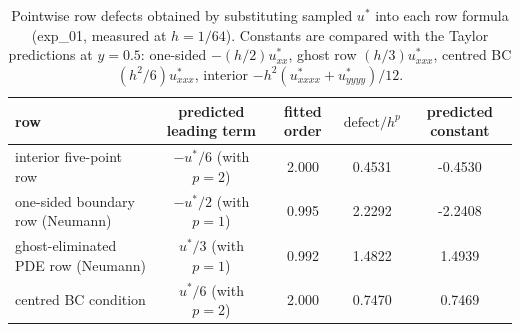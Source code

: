 \begin{table}[H]
\centering\footnotesize\setlength{\tabcolsep}{4pt}
\caption{Pointwise row defects obtained by substituting sampled $u^*$ into each row formula (exp\_01, measured at $h=1/64$).  Constants are compared with the Taylor predictions at $y=0.5$: one-sided $-(h/2)u^*_{xx}$, ghost row $(h/3)u^*_{xxx}$, centred BC $(h^2/6)u^*_{xxx}$, interior $-h^2(u^*_{xxxx}+u^*_{yyyy})/12$.}
\label{tab:rowdefects}
\begin{tabular}{lcccc}
\toprule
row & predicted leading term & fitted order & $\text{defect}/h^{p}$ & predicted constant \\
\midrule
interior five-point row & $-u^*/6$ (with $p=2$) & 2.000 & 0.4531 & -0.4530 \\
one-sided boundary row (Neumann) & $-u^*/2$ (with $p=1$) & 0.995 & 2.2292 & -2.2408 \\
ghost-eliminated PDE row (Neumann) & $u^*/3$ (with $p=1$) & 0.992 & 1.4822 & 1.4939 \\
centred BC condition & $u^*/6$ (with $p=2$) & 2.000 & 0.7470 & 0.7469 \\
\bottomrule
\end{tabular}
\end{table}
